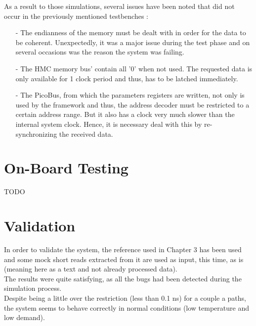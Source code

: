 As a result to those simulations, several issues have been noted that did not occur in the previously mentioned testbenches :
\begin{itemize}
    \item [-] The endianness of the memory must be dealt with in order for the data to be coherent. Unexpectedly, it was a major issue during the test phase and on several occasions was the reason the system was failing.
    \item [-] The HMC memory bus' contain all '0' when not used. The requested data is only available for 1 clock period and thus, has to be latched immediately.
    \item [-] The PicoBus, from which the parameters registers are written, not only is used by the framework and thus, the address decoder must be restricted to a certain address range. But it also has a clock very much slower than the internal system clock. Hence, it is necessary deal with this by re-synchronizing the received data.
\end{itemize}

\section{On-Board Testing}
TODO
\section{Validation}

In order to validate the system, the reference used in Chapter 3 has been used and some mock short reads extracted from it are used as input, this time, as is (meaning here as a text and not already processed data). \\

The results were quite satisfying, as all the bugs had been detected during the simulation process. \\

Despite being a little over the restriction (less than 0.1 ns) for a couple a paths, the system seems to behave correctly in normal conditions (low temperature and low demand).
